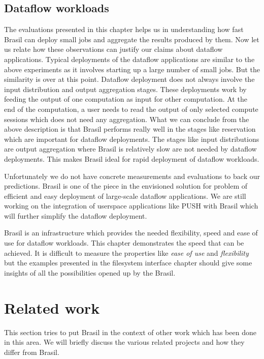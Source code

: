 \documentclass[conference]{sig-alternate}
\begin{document}
\subsection{Dataflow workloads}
The evaluations presented in this chapter helps us in understanding how fast
Brasil can deploy small jobs and aggregate the results produced by them.  Now
let us relate how these observations can justify our claims about dataflow
applications. Typical deployments of the dataflow applications are similar to
the above experiments as it involves starting up a large number of small jobs.
But the similarity is over at this point. Dataflow deployment does not always
involve the input distribution and output aggregation stages.  These deployments
work by feeding the output of one computation as input for other computation. 
At the end of the computation, a user needs to read the output of only selected
compute sessions which does not need any aggregation.  What we can conclude from
the above description is that Brasil performs really well in the stages like
reservation which are important for dataflow deployments.  The stages like input
distributions are output aggregation where Brasil is relatively slow are not
needed by dataflow deployments.  This makes Brasil ideal for rapid deployment of
dataflow workloads.

Unfortunately we do not have concrete measurements and evaluations to back our
predictions.  Brasil is one of the piece in the envisioned solution for problem
of efficient and easy deployment of large-scale dataflow applications.   We are
still working on the integration of userspace applications like
PUSH\cite{PODC:Push} with Brasil which will further simplify the dataflow
deployment.


Brasil is an infrastructure which provides the needed flexibility, speed and 
ease of use for dataflow workloads.  This chapter demonstrates the speed that
can be achieved.  It is difficult to measure the properties like \textit{ease of
use} and \textit{flexibility} but the examples presented in the filesystem
interface chapter should give some insights of all the possibilities opened up
by the Brasil.


\section{Related work}


This section tries to put Brasil in the context of other work which 
has been done in this area.  We will briefly discuss the various related
projects and how they differ from Brasil.
\end{document}
